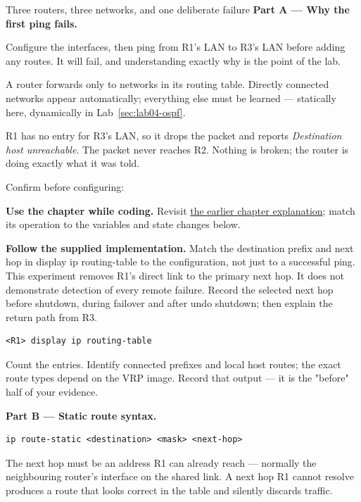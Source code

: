 \begin{labproject}{Three routers, three networks, and one deliberate failure}
\medskip\noindent\textbf{Part A --- Why the first ping fails.}\par
Configure the interfaces, then ping from R1's LAN to R3's LAN before adding any routes. It will fail, and understanding exactly why is the point of the lab.

\begin{keyidea}
A router forwards only to networks in its routing table. Directly connected networks appear automatically; everything else must be learned --- statically here, dynamically in Lab~\ref{sec:lab04-ospf}.

R1 has no entry for R3's LAN, so it drops the packet and reports \emph{Destination host unreachable}. The packet never reaches R2. Nothing is broken; the router is doing exactly what it was told.
\end{keyidea}

Confirm before configuring:


\textbf{Use the chapter while coding.} Revisit \hyperref[ch:static-routing]{the earlier chapter explanation}; match its operation to the variables and state changes below.

\textbf{Follow the supplied implementation.} Match the destination prefix and next hop in display ip routing-table to the configuration, not just to a successful ping. This experiment removes R1's direct link to the primary next hop. It does not demonstrate detection of every remote failure. Record the selected next hop before shutdown, during failover and after undo shutdown; then explain the return path from R3.


\begin{lstlisting}[style=utpterminal]
<R1> display ip routing-table
\end{lstlisting}

Count the entries. Identify connected prefixes and local host routes; the exact route types depend on the VRP image. Record that output --- it is the "before" half of your evidence.

\medskip\noindent\textbf{Part B --- Static route syntax.}\par

\begin{lstlisting}[style=utpterminal]
ip route-static <destination> <mask> <next-hop>
\end{lstlisting}

The next hop must be an address R1 can already reach --- normally the neighbouring router's interface on the shared link. A next hop R1 cannot resolve produces a route that looks correct in the table and silently discards traffic.


\end{labproject}

